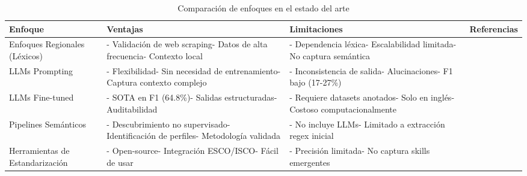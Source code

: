 \begin{table}[H]
\centering
\caption{Comparación de enfoques en el estado del arte}
\label{tab:estado-arte-comparativo}
\begin{tabular}{|p{3cm}|p{4cm}|p{4cm}|p{3cm}|}
\hline
\textbf{Enfoque} & \textbf{Ventajas} & \textbf{Limitaciones} & \textbf{Referencias} \\
\hline
Enfoques Regionales (Léxicos) & - Validación de web scraping\newline - Datos de alta frecuencia\newline - Contexto local & - Dependencia léxica\newline - Escalabilidad limitada\newline - No captura semántica & \parencite{rubio2024, aguilera2018, martinez2024} \\
\hline
LLMs Prompting & - Flexibilidad\newline - Sin necesidad de entrenamiento\newline - Captura contexto complejo & - Inconsistencia de salida\newline - Alucinaciones\newline - F1 bajo (17-27\%) & \parencite{nguyen2024} \\
\hline
LLMs Fine-tuned & - SOTA en F1 (64.8\%)\newline - Salidas estructuradas\newline - Auditabilidad & - Requiere datasets anotados\newline - Solo en inglés\newline - Costoso computacionalmente & \parencite{herandi2024, zhang2022} \\
\hline
Pipelines Semánticos & - Descubrimiento no supervisado\newline - Identificación de perfiles\newline - Metodología validada & - No incluye LLMs\newline - Limitado a extracción regex inicial & \parencite{lukauskas2023} \\
\hline
Herramientas de Estandarización & - Open-source\newline - Integración ESCO/ISCO\newline - Fácil de usar & - Precisión limitada\newline - No captura skills emergentes & \parencite{kavargyris2025} \\
\hline
\end{tabular}
\end{table}

